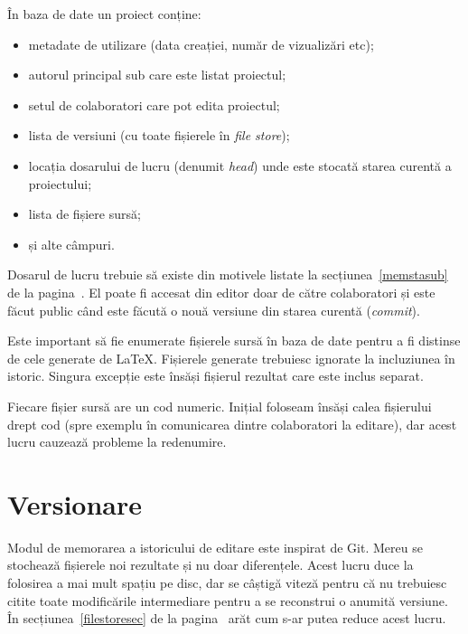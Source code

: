 \documentclass[a4wide,12pt]{report}
\newcommand{\eng}[1]{\emph{#1}} %
\newcommand{\acr}[1]{{\textsmaller[1]{\textsc{#1}}}} %
\begin{document}
În baza de date un proiect conține:

\begin{itemize}

\item metadate de utilizare (data creației, număr de vizualizări etc);

\item autorul principal sub care este listat proiectul;

\item setul de colaboratori care pot edita proiectul;

\item lista de versiuni (cu toate fișierele în \eng{file store});

\item locația dosarului de lucru (denumit \eng{head}) unde este stocată starea
curentă a proiectului;

\item lista de fișiere sursă;

\item și alte câmpuri.

\end{itemize}

Dosarul de lucru trebuie să existe din motivele listate la
secțiunea~\ref{memstasub} de la pagina~\pageref{memstasub}. El poate fi accesat
din editor doar de către colaboratori și este făcut public când este făcută o
nouă versiune din starea curentă (\eng{commit}).

Este important să fie enumerate fișierele sursă în baza de date pentru a fi
distinse de cele generate de \LaTeX{}. Fișierele generate trebuiesc ignorate la
incluziunea în istoric. Singura excepție este însăși fișierul \acr{PDF} rezultat
care este inclus separat.

Fiecare fișier sursă are un cod numeric. Inițial foloseam însăși calea
fișierului drept cod (spre exemplu în comunicarea dintre colaboratori la
editare), dar acest lucru cauzează probleme la redenumire.

\section{Versionare}
\label{versionaresec}

Modul de memorarea a istoricului de editare este inspirat de Git. Mereu se
stochează fișierele noi rezultate și nu doar diferențele. Acest lucru duce la
folosirea a mai mult spațiu pe disc, dar se câștigă viteză pentru că nu
trebuiesc citite toate modificările intermediare pentru a se reconstrui o
anumită versiune. În secțiunea~\ref{filestoresec} de la
pagina~\pageref{filestoresec} arăt cum s-ar putea reduce acest lucru.
\end{document}
